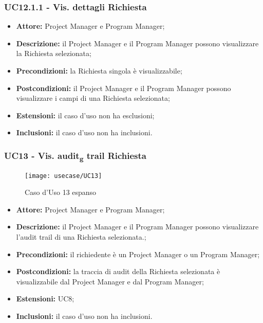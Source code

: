 \subsubsection*{UC12.1.1 - Vis. dettagli Richiesta}

\begin{itemize}[label=$\circ$]
\item \textbf{Attore:} Project Manager e Program Manager;
\item \textbf{Descrizione:} il Project Manager e il Program Manager possono visualizzare la Richiesta selezionata;
\item \textbf{Precondizioni:} la Richiesta singola è visualizzabile;
\item \textbf{Postcondizioni:} il Project Manager e il Program Manager possono visualizzare i campi di una Richiesta selezionata;
\item \textbf{Estensioni:} il caso d'uso non ha esclusioni;
\item \textbf{Inclusioni:} il caso d'uso non ha inclusioni.
\end{itemize}

\subsubsection*{UC13 - Vis. audit\textsubscript{g} trail Richiesta}

\begin{figure}[H] 
    \centering 
    \texttt{[image: usecase/UC13]} 
    \caption{Caso d'Uso 13 espanso}
\end{figure}

\begin{itemize}[label=$\circ$]
\item \textbf{Attore:} Project Manager e Program Manager;
\item \textbf{Descrizione:} il Project Manager e il Program Manager possono visualizzare l'audit trail di una Richiesta selezionata.;
\item \textbf{Precondizioni:} il richiedente è un Project Manager o un Program Manager;
\item \textbf{Postcondizioni:} la traccia di audit della Richiesta selezionata è visualizzabile dal Project Manager e dal Program Manager;
\item \textbf{Estensioni:} UC8;
\item \textbf{Inclusioni:} il caso d'uso non ha inclusioni.
\end{itemize}

